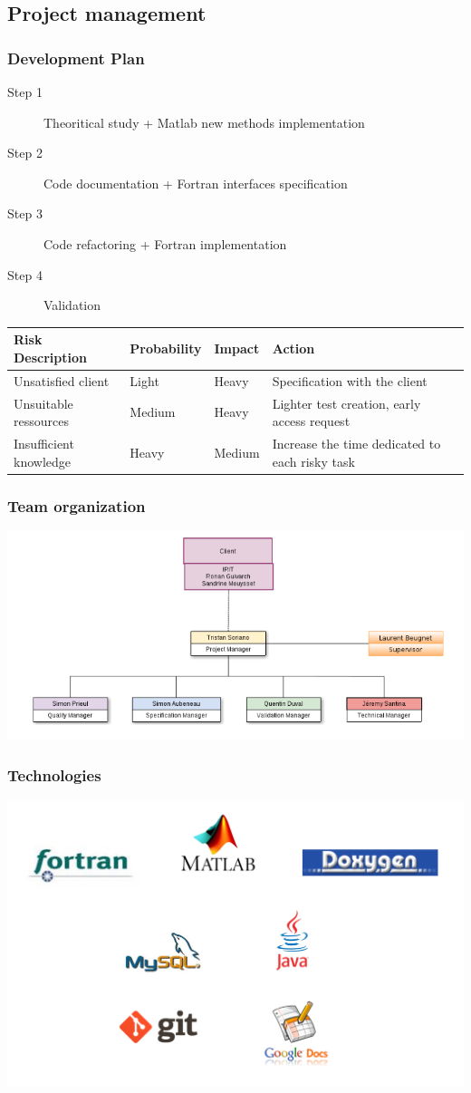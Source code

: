 \documentclass[10p]{beamer}
\begin{document}
\subsection{Project management}
\begin{frame}
\small
\frametitle{Development Plan}
\begin{description}
\item [Step 1] Theoritical study + Matlab new methods implementation
\item [Step 2] Code documentation + Fortran interfaces specification
\item [Step 3] Code refactoring + Fortran implementation
\item [Step 4] Validation
\end{description}
\tiny
\begin{tabular}{|l|l|l|l|}
\hline
\textbf{Risk Description} & \textbf{Probability} & \textbf{Impact} & \textbf{Action}
\\
\hline
Unsatisfied client & Light & Heavy & Specification with the client
\\
\hline
Unsuitable ressources & Medium & Heavy & Lighter test creation, early access request
\\
\hline
Insufficient knowledge & Heavy & Medium & Increase the time dedicated to each risky task
\\
\hline
\end{tabular}
\end{frame}
\begin{frame}
\frametitle{Team organization}
\includegraphics[width=\textwidth]{Image/organisation.png}
\end{frame}
\begin{frame}
\frametitle{Technologies}
\includegraphics[width=\textwidth]{Image/logos.png}
\end{frame}
\end{document}
